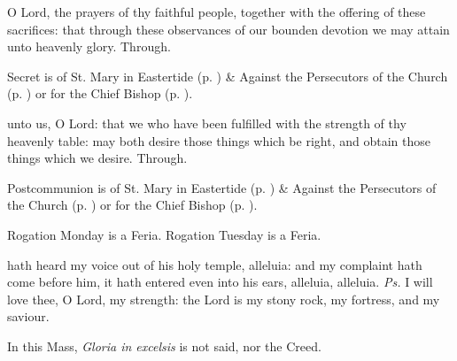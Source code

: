 \secret
{} O Lord, the prayers of thy faithful people, together with the offering of these sacrifices: that through these observances of our bounden devotion we may attain unto heavenly glory. Through.
\begin{rubric}
     Secret is of St. Mary in Eastertide (p. \pageref{SPMaryInEaster}) \&  Against the Persecutors of the Church (p. \pageref{SPAgainst}) or for the Chief Bishop (p. \pageref{SPChiefBishop}).
\end{rubric}
\postcommunion
{} unto us, O Lord: that we who have been fulfilled with the strength of thy heavenly table: may both desire those things which be right, and obtain those things which we desire. Through.
\begin{rubric}
     Postcommunion is of St. Mary in Eastertide (p. \pageref{SPMaryInEaster}) \&  Against the Persecutors of the Church (p. \pageref{SPAgainst}) or for the Chief Bishop (p. \pageref{SPChiefBishop}).
\end{rubric}

\begin{rubric}
	Rogation Monday is a  Feria. Rogation Tuesday is a Feria.
\end{rubric}

\introit
{} hath heard my voice out of his holy temple, alleluia: and my complaint hath come before him, it hath entered even into his ears, alleluia, alleluia. \textit{Ps.} I will love thee, O Lord, my strength: the Lord is my stony rock, my fortress, and my saviour.
\begin{rubric}
    In this Mass, \emph{Gloria in excelsis} is not said, nor the Creed.
\end{rubric}

